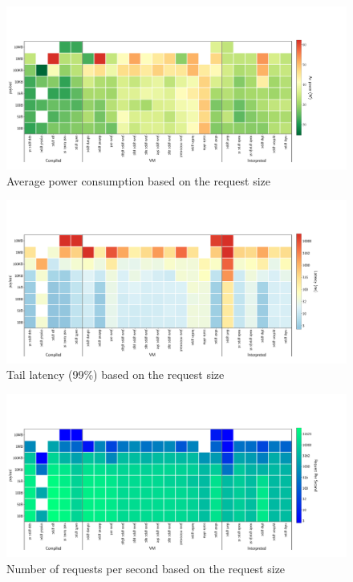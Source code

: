 \begin{figure}[!hbt]
    \begin{center}
        \includegraphics[width=1.2\linewidth]{imgs/power_consumption_payload}
    \end{center}
    \caption{Average power consumption based on the request size}\label{fig:power_consumption_payload}
\end{figure}


\begin{figure}[!hbt]
    \begin{center}
        \includegraphics[width=1.2\linewidth]{imgs/tail99_payload}
    \end{center}
    \caption{Tail latency (99\%) based on the request size}\label{fig:tail99_payload}
\end{figure}

\begin{figure}[!hbt]
    \begin{center}
        \includegraphics[width=1.2\linewidth]{imgs/rps_payload}
    \end{center}
    \caption{Number of requests per second based on the request size}\label{fig:rps_payload}
\end{figure}

